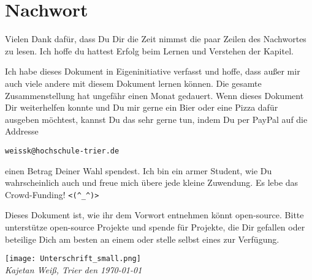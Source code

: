 \chapter{Nachwort}
Vielen Dank dafür, dass Du Dir die Zeit nimmst die paar Zeilen des Nachwortes zu lesen. Ich hoffe du hattest Erfolg beim Lernen und Verstehen der Kapitel.

Ich habe dieses Dokument in Eigeninitiative verfasst und hoffe, dass außer mir auch viele andere mit diesem Dokument lernen können. Die gesamte Zusammenstellung hat ungefähr einen Monat gedauert. Wenn dieses Dokument Dir weiterhelfen konnte und Du mir gerne ein Bier oder eine Pizza dafür ausgeben möchtest, kannst Du das sehr gerne tun, indem Du per PayPal auf die Addresse
\begin{center}
	\texttt{weissk@hochschule-trier.de}
\end{center}
einen Betrag Deiner Wahl spendest. Ich bin ein armer Student, wie Du wahrscheinlich auch und freue mich übere jede kleine Zuwendung. Es lebe das Crowd-Funding! \verb+<(^_^)>+

Dieses Dokument ist, wie ihr dem Vorwort entnehmen könnt open-source. Bitte unterstütze open-source Projekte und spende für Projekte, die Dir gefallen oder beteilige Dich  am besten an einem oder stelle selbst eines zur Verfügung.

\texttt{[image: Unterschrift\_small.png]}\\
\textsl{Kajetan Weiß, Trier den \today}